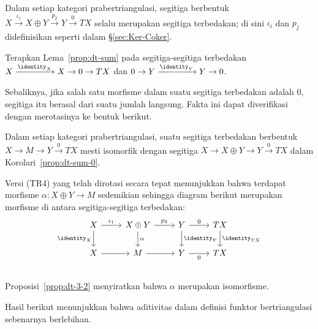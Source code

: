 \begin{korolari}\label{prop:dt-sum-0}
	Dalam setiap kategori prabertriangulasi, segitiga berbentuk
	$X \xrightarrow{\iota_1} X \oplus Y \xrightarrow{p_2} Y \xrightarrow{0} TX$
	selalu merupakan segitiga terbedakan; di sini $\iota_i$ dan $p_j$
	didefinisikan seperti dalam \S\ref{sec:Ker-Coker}.
\end{korolari}

\begin{bukti}
	Terapkan Lema~\ref{prop:dt-sum} pada segitiga-segitiga terbedakan
	$X \xrightarrow{\identity_X} X \to 0 \to TX$ dan
	$0 \to Y \xrightarrow{\identity_Y} Y \to 0$.
\end{bukti}

Sebaliknya, jika salah satu morfisme dalam suatu segitiga terbedakan adalah
$0$, segitiga itu berasal dari suatu jumlah langsung. Fakta ini dapat
diverifikasi dengan merotasinya ke bentuk berikut.

\begin{proposisi}\label{prop:dt-sum-1}
	Dalam setiap kategori prabertriangulasi, suatu segitiga terbedakan berbentuk
	$X \to M \to Y \xrightarrow{0} TX$ mesti isomorfik dengan segitiga
	$X \to X \oplus Y \to Y \xrightarrow{0} TX$ dalam
	Korolari~\ref{prop:dt-sum-0}.
\end{proposisi}

\begin{bukti}
	Versi (TR4) yang telah dirotasi secara tepat menunjukkan bahwa terdapat
	morfisme $\alpha: X \oplus Y \to M$ sedemikian sehingga diagram berikut
	merupakan morfisme di antara segitiga-segitiga terbedakan:
	\[\begin{tikzcd}
		X \arrow[r, "\iota_1"] \arrow[d, "\identity_X"'] & X \oplus Y \arrow[r, "p_2"] \arrow[d, "\alpha"] & Y \arrow[r, "0"] \arrow[d, "\identity_Y"] & TX \arrow[d, "\identity_{TX}"] \\
		X \arrow[r] & M  \arrow[r] & Y \arrow[r, "0"']  & TX \\
	\end{tikzcd}\]
	Proposisi~\ref{prop:dt-3-2} menyiratkan bahwa $\alpha$ merupakan
	isomorfisme.
\end{bukti}

Hasil berikut menunjukkan bahwa aditivitas dalam definisi funktor
bertriangulasi sebenarnya berlebihan.

